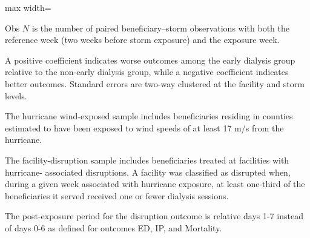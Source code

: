 \documentclass[11pt]{article}
\begin{document}
\begin{table}[!htbp]
\begin{adjustbox}{max width=\textwidth}
\begin{threeparttable}
\begin{tablenotes}[flushleft]
\item[a]
Obs $N$ is the number of paired beneficiary–storm observations with both the reference
week (two weeks before storm exposure) and the exposure week.

\item[b]
A positive coefficient indicates worse outcomes among the early dialysis group relative to
the non-early dialysis group, while a negative coefficient indicates better outcomes. Standard
errors are two-way clustered at the facility and storm levels.

\item[c]
The hurricane wind-exposed sample includes beneficiaries residing in counties estimated to
have been exposed to wind speeds of at least 17 m/s from the hurricane.

\item[d]
The facility-disruption sample includes beneficiaries treated at facilities with hurricane-
associated disruptions. A facility was classified as disrupted when, during a given week
associated with hurricane exposure, at least one-third of the beneficiaries it served received
one or fewer dialysis sessions.

\item[e]
The post-exposure period for the disruption outcome is relative days 1-7 instead of days 0-6 as defined for outcomes ED, IP, and Mortality.

\end{tablenotes}

\end{threeparttable}
\end{adjustbox}

\end{table}
\end{document}
